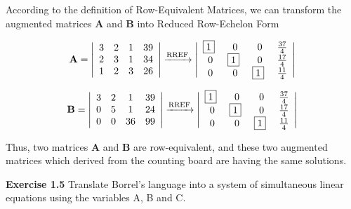 \documentclass[12pt]{article}
\newcommand{\A} {\mathbf{A}}
\newcommand{\B} {\mathbf{B}}
\newcommand{\RREF} {Reduced Row-Echelon Form}
\newcommand{\REMM} {Row-Equivalent Matrices}
\begin{document}
According to the definition of \REMM,
we can transform the augmented matrices \(\A\) and \(\B\) into \RREF

\[
\A=
\left|
  \begin{array}{cccc}
    3 & 2 & 1 & 39 \\
    2 & 3 & 1 & 34 \\
    1 & 2 & 3 & 26 \\
  \end{array}
\right|
\xrightarrow[]{\text{RREF}}
\left|
\begin{array}{cccc}
  	$\boxed{1}$~ & 0 & 0 & \frac{37}{4} \\
    0 & $\boxed{1}$~ & 0 & \frac{17}{4} \\
    0 & 0 & $\boxed{1}$~ & \frac{11}{4} \\
  \end{array}
\right|
\]

\[
\B=
\left|
  \begin{array}{cccc}
    3 & 2 & 1 & 39 \\
    0 & 5 & 1 & 24 \\
    0 & 0 & 36 & 99 \\
  \end{array}
\right|
\xrightarrow[]{\text{RREF}}
\left|
\begin{array}{cccc}
  	$\boxed{1}$~ & 0 & 0 & \frac{37}{4} \\
    0 & $\boxed{1}$~ & 0 & \frac{17}{4} \\
    0 & 0 & $\boxed{1}$~ & \frac{11}{4} \\
  \end{array}
\right|
\]

Thus, two matrices \(\A\) and \(\B\) are row-equivalent,
and these two augmented matrices which derived from the counting board are having the same solutions.

\pagebreak

\noindent\textbf{Exercise 1.5} Translate Borrel's language into a system of
simultaneous linear equations using the variables A, B and C.

\bigskip
\end{document}
